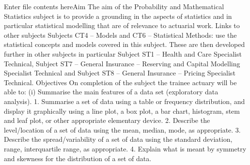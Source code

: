 Enter file contents hereAim  
The aim of the Probability and Mathematical Statistics subject is to provide a grounding in the aspects of statistics and in particular statistical modelling that are of relevance to actuarial work.  
Links to other subjects  
Subjects CT4 – Models and CT6 – Statistical Methods: use the statistical concepts and models covered in this subject.  These are then developed further in other subjects in particular Subject ST1 – Health and Care Specialist Technical, Subject ST7 – General Insurance – Reserving and Capital Modelling Specialist Technical and Subject ST8 – General Insurance – Pricing Specialist Technical.  
Objectives  
On completion of the subject the trainee actuary will be able to:  
(i) Summarise the main features of a data set (exploratory data analysis).  
 1. Summarise a set of data using a table or frequency distribution, and display it graphically using a line plot, a box plot, a bar chart, histogram, stem and leaf plot, or other appropriate elementary device.  
 2. Describe the level/location of a set of data using the mean, median, mode, as appropriate.  
 3. Describe the spread/variability of a set of data using the standard deviation, range, interquartile range, as appropriate.  
 4. Explain what is meant by symmetry and skewness for the distribution of a set of data.  

